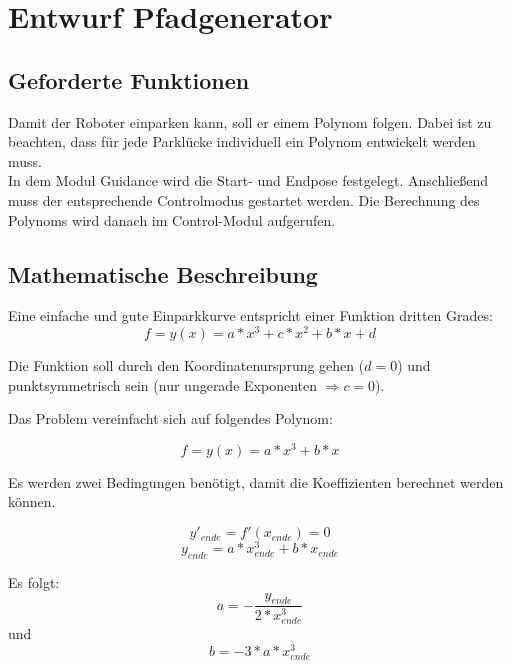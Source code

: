 \chapter{Entwurf Pfadgenerator}

\section{Geforderte Funktionen}

Damit der Roboter einparken kann, soll er einem Polynom folgen. Dabei ist zu beachten, dass für jede Parklücke individuell ein Polynom entwickelt werden muss.\\

\noindent In dem Modul Guidance wird die Start- und Endpose festgelegt. Anschließend muss der entsprechende Controlmodus gestartet werden. Die Berechnung des Polynoms wird danach im Control-Modul aufgerufen. 


\section{Mathematische Beschreibung}

Eine einfache und gute Einparkkurve entspricht einer Funktion dritten Grades:
\begin{equation}
f=y(x)=a*x^3+c*x^2+b*x+d
\end{equation}

\noindent Die Funktion soll durch den Koordinatenursprung gehen ($ d=0 $) und punktsymmetrisch sein (nur ungerade Exponenten $ \Rightarrow c=0 $). 

\noindent Das Problem vereinfacht sich auf folgendes Polynom:

\begin{equation}
f=y(x)=a*x^3+b*x
\end{equation}

\noindent Es werden zwei Bedingungen benötigt, damit die Koeffizienten berechnet werden können. 

\begin{equation}
 y'_{ende}=f'(x_{ende})=0
 \end{equation}
 \begin{equation}
y_{ende}=a*x_{ende}^3+b*x_{ende}
 \end{equation}
 
\noindent Es folgt:
 \begin{equation}
a=-\dfrac{y_{ende}}{2*x_{ende}^3}
\end{equation}
\noindent und
\begin{equation} 
b=-3*a*x_{ende}^3
\end{equation}

